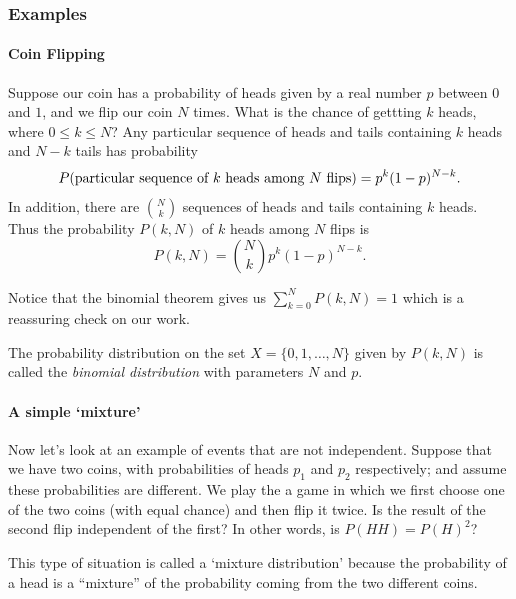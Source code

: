 \documentclass[
]{article}
\begin{document}
\hypertarget{examples}{%
\subsubsection{Examples}\label{examples}}

\hypertarget{coin-flipping}{%
\paragraph{Coin Flipping}\label{coin-flipping}}

Suppose our coin has a probability of heads given by a real number \(p\)
between \(0\) and \(1\), and we flip our coin \(N\) times. What is the
chance of gettting \(k\) heads, where \(0\le k\le N\)? Any particular
sequence of heads and tails containing \(k\) heads and \(N-k\) tails has
probability \[
P(\hbox{\rm particular sequence of $k$ heads among $N$ flips}) = p^{k}(1-p)^{N-k}.
\] In addition, there are \(\binom{N}{k}\) sequences of heads and tails
containing \(k\) heads. Thus the probability \(P(k,N)\) of \(k\) heads
among \(N\) flips is \begin{equation}
P(k,N) = \binom{N}{k}p^{k}(1-p)^{N-k}.
\label{eq:binomial}\end{equation}

Notice that the binomial theorem gives us \(\sum_{k=0}^{N} P(k,N) =1\)
which is a reassuring check on our work.

The probability distribution on the set \(X=\{0,1,\ldots,N\}\) given by
\(P(k,N)\) is called the \emph{binomial distribution} with parameters
\(N\) and \(p\).

\hypertarget{a-simple-mixture}{%
\paragraph{A simple `mixture'}\label{a-simple-mixture}}

Now let's look at an example of events that are not independent. Suppose
that we have two coins, with probabilities of heads \(p_1\) and \(p_2\)
respectively; and assume these probabilities are different. We play the
a game in which we first choose one of the two coins (with equal chance)
and then flip it twice. Is the result of the second flip independent of
the first? In other words, is \(P(HH)=P(H)^2\)?

This type of situation is called a `mixture distribution' because the
probability of a head is a ``mixture'' of the probability coming from
the two different coins.
\end{document}
